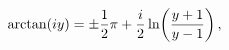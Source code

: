 \[\mathop{\mathrm{arctan}\/}\nolimits\!\left(iy\right)=\pm\frac{1}{2}\pi+\frac{i%
}{2}\mathop{\ln\/}\nolimits\!\left(\frac{y+1}{y-1}\right),\]